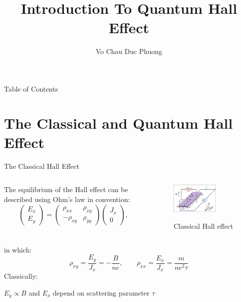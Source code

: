 \documentclass{beamer}
\author{Vo Chau Duc Phuong}
\institute[ICTP]{The Abdus Salam International Center for Theretical Physics}
\title[Introduction To Quantum Hall Effect]{Introduction To Quantum Hall Effect}
\begin{document}
	\begin{frame}
		\titlepage
	\end{frame}
	\begin{frame}{Table of Contents}
		\tableofcontents
	\end{frame}
	\section{The Classical and Quantum Hall Effect}
\begin{frame}{The Classical Hall Effect}
\begin{columns}
	\begin{column}{0.5\textwidth}
\quad The equilibrium of the Hall effect can be described using Ohm's law in convention:
$$\begin{pmatrix}
	E_x\\E_y
\end{pmatrix}
= \begin{pmatrix}
	\rho_{xx} & \rho_{xy}\\
	-\rho_{xy} & \rho_{yy}
\end{pmatrix}
\begin{pmatrix}
	J_x\\0
\end{pmatrix},$$
	\end{column}
	\begin{column}{0.5\textwidth}
		\begin{figure}
			\centering
\includegraphics[width=0.7\textwidth]{Images/Hall effect.png}
\label{fig: Ohm clas}
\caption{Classical Hall effect}

		\end{figure}
	\end{column}
\end{columns}
\vspace{-0.3cm}in which:
$$	\rho_{xy} = \frac{E_y}{J_x} = -\frac{B}{ne},\qquad
	\rho_{xx} = \frac{E_x}{J_x} = \frac{m}{ne^2 \tau}$$
Classically:
\begin{center}
	\(E_y \propto B\) and \(E_x\) depend on scattering parameter \(\tau\)
\end{center}
\end{frame}
\end{document}
